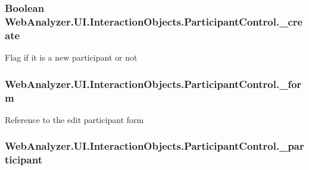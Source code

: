 \subsubsection[{\+\_\+create}]{\setlength{\rightskip}{0pt plus 5cm}Boolean Web\+Analyzer.\+U\+I.\+Interaction\+Objects.\+Participant\+Control.\+\_\+create\hspace{0.3cm}{\ttfamily [private]}}\label{class_web_analyzer_1_1_u_i_1_1_interaction_objects_1_1_participant_control_a9526dab215a152dae475ec8b6098f15d}


Flag if it is a new participant or not 

\hypertarget{class_web_analyzer_1_1_u_i_1_1_interaction_objects_1_1_participant_control_ab9a43552c6e7c3b421ddc4d1a4c3dc2b}{}
\subsubsection[{\+\_\+form}]{ Web\+Analyzer.\+U\+I.\+Interaction\+Objects.\+Participant\+Control.\+\_\+form\hspace{0.3cm}{\ttfamily [private]}}\label{class_web_analyzer_1_1_u_i_1_1_interaction_objects_1_1_participant_control_ab9a43552c6e7c3b421ddc4d1a4c3dc2b}


Reference to the edit participant form 

\hypertarget{class_web_analyzer_1_1_u_i_1_1_interaction_objects_1_1_participant_control_ae7f805fadde2e1d9088c751bc5860b94}{}
\subsubsection[{\+\_\+participant}]{ Web\+Analyzer.\+U\+I.\+Interaction\+Objects.\+Participant\+Control.\+\_\+participant\hspace{0.3cm}{\ttfamily [private]}}\label{class_web_analyzer_1_1_u_i_1_1_interaction_objects_1_1_participant_control_ae7f805fadde2e1d9088c751bc5860b94}


